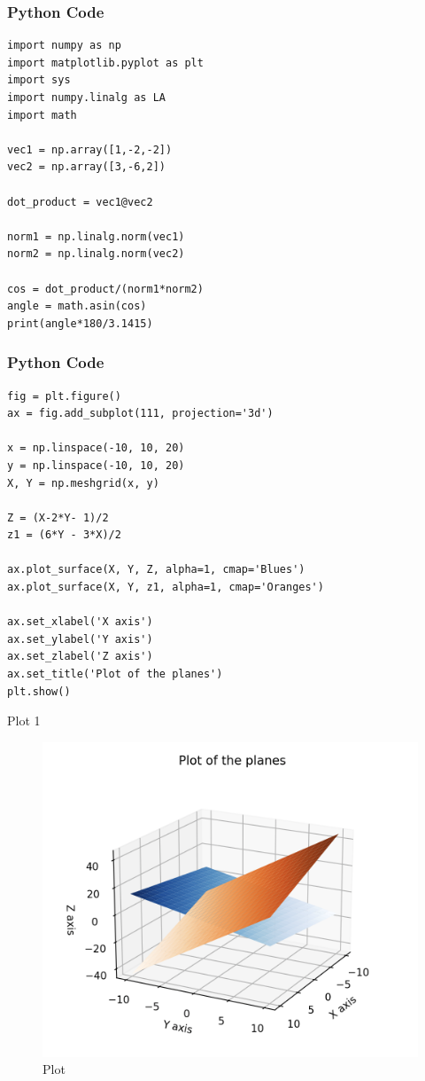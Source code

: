 \documentclass{beamer}
\begin{document}
\begin{frame}[fragile]
    \frametitle{Python Code}
    \begin{lstlisting}
import numpy as np
import matplotlib.pyplot as plt
import sys
import numpy.linalg as LA
import math

vec1 = np.array([1,-2,-2])
vec2 = np.array([3,-6,2])

dot_product = vec1@vec2

norm1 = np.linalg.norm(vec1)
norm2 = np.linalg.norm(vec2)

cos = dot_product/(norm1*norm2)
angle = math.asin(cos)
print(angle*180/3.1415)

\end{lstlisting}
\end{frame}

\begin{frame}[fragile]
    \frametitle{Python Code}

    \begin{lstlisting}
fig = plt.figure()
ax = fig.add_subplot(111, projection='3d')

x = np.linspace(-10, 10, 20)
y = np.linspace(-10, 10, 20)
X, Y = np.meshgrid(x, y)

Z = (X-2*Y- 1)/2
z1 = (6*Y - 3*X)/2

ax.plot_surface(X, Y, Z, alpha=1, cmap='Blues')
ax.plot_surface(X, Y, z1, alpha=1, cmap='Oranges')

ax.set_xlabel('X axis')
ax.set_ylabel('Y axis')
ax.set_zlabel('Z axis')
ax.set_title('Plot of the planes')
plt.show()

    \end{lstlisting}
\end{frame}


\begin{frame}{Plot 1}
\begin{figure}
    \centering
    \includegraphics[width=0.8\columnwidth]{Figs/Figure_3.2.png}
    \caption{Plot}
    \label{fig:placeholder}
\end{figure}
\end{frame}
\end{document}
